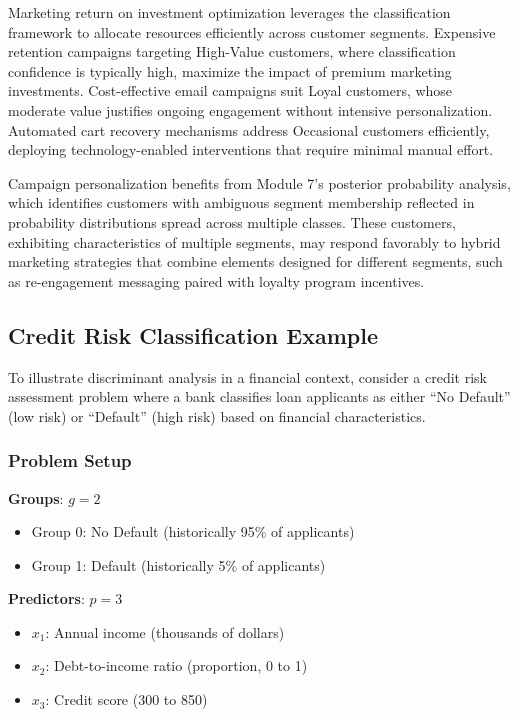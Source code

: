 \documentclass[
]{article}
\begin{document}
Marketing return on investment optimization leverages the classification
framework to allocate resources efficiently across customer segments.
Expensive retention campaigns targeting High-Value customers, where
classification confidence is typically high, maximize the impact of
premium marketing investments. Cost-effective email campaigns suit Loyal
customers, whose moderate value justifies ongoing engagement without
intensive personalization. Automated cart recovery mechanisms address
Occasional customers efficiently, deploying technology-enabled
interventions that require minimal manual effort.

Campaign personalization benefits from Module 7's posterior probability
analysis, which identifies customers with ambiguous segment membership
reflected in probability distributions spread across multiple classes.
These customers, exhibiting characteristics of multiple segments, may
respond favorably to hybrid marketing strategies that combine elements
designed for different segments, such as re-engagement messaging paired
with loyalty program incentives.

\subsection{Credit Risk Classification Example}

To illustrate discriminant analysis in a financial context, consider a
credit risk assessment problem where a bank classifies loan applicants
as either ``No Default'' (low risk) or ``Default'' (high risk) based on
financial characteristics.

\subsubsection{Problem Setup}

\textbf{Groups}: \(g = 2\)

\begin{itemize}
\item
  Group 0: No Default (historically 95\% of applicants)
\item
  Group 1: Default (historically 5\% of applicants)
\end{itemize}

\textbf{Predictors}: \(p = 3\)

\begin{itemize}
\item
  \(x_{1}\): Annual income (thousands of dollars)
\item
  \(x_{2}\): Debt-to-income ratio (proportion, 0 to 1)
\item
  \(x_{3}\): Credit score (300 to 850)
\end{itemize}
\end{document}
